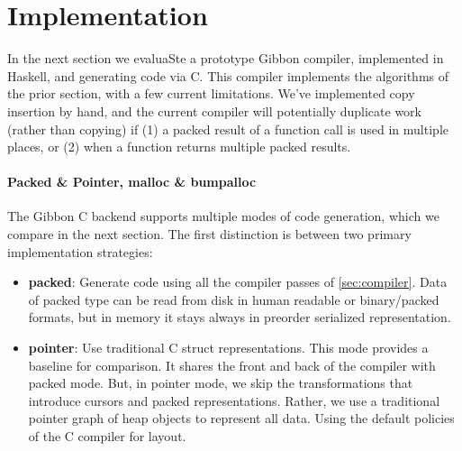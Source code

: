 \documentclass[a4paper,english]{lipics-v2016}
\newcommand{\treelang}{Gibbon\xspace} %
\begin{document}




\section{Implementation}\label{sec:impl}

In the next section we evaluaSte a prototype \treelang compiler, implemented in
Haskell, and generating code via C. 
%
This compiler implements the algorithms of the prior section, with a few current
limitations.  We've implemented copy insertion by hand, and the current compiler
will potentially duplicate work (rather than copying) if (1) a packed result of a
function call is used in multiple places, or (2) when a function returns multiple
packed results.

\paragraph*{Packed \& Pointer, malloc \& bumpalloc}

The \treelang C backend supports multiple modes of code generation, which we
compare in the next section.  The first distinction is between two primary
implementation strategies:

\begin{itemize}
\item {\bf packed}: Generate code using all the compiler passes of
  \cref{sec:compiler}.  Data of packed type can be read from disk in human
  readable or binary/packed formats, but in memory it stays always in preorder
  serialized representation.
\item {\bf pointer}: Use traditional C struct representations.  This mode
  provides a baseline for comparison.  It shares the front and back of the
  compiler with packed mode.  But, in pointer mode, we skip the transformations
  that introduce cursors and packed representations.  Rather, we use a
  traditional pointer graph of heap objects to represent all data.  Using the
  default policies of the C compiler for  layout.
\end{itemize}
\end{document}
